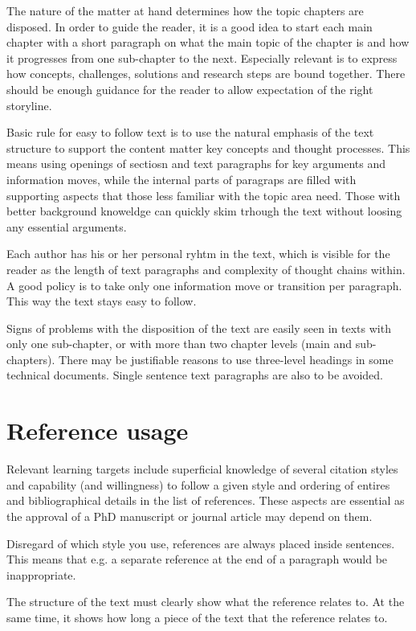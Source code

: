 The nature of the matter at hand determines how the topic chapters are disposed.
In order to guide the reader, it is a good idea to start each main chapter with a short paragraph 
on what the main topic of the chapter is and how it progresses from one sub-chapter to the
next. Especially relevant is to express how concepts, challenges,
solutions and research steps are bound together. There should be enough
guidance for the reader to allow expectation of the right storyline.


Basic rule for easy to follow text is to use the natural emphasis of the
text structure to support the content matter key concepts and thought
processes. This means using openings of sectiosn and text paragraphs for
key arguments and information moves, while the internal parts of
paragraps are filled with supporting aspects that those less familiar
with the topic area need. Those with better background knoweldge can
quickly skim trhough the text without loosing any essential arguments.

Each author has his or her personal ryhtm in the text, which is visible
for the reader as the length of text paragraphs and complexity of
thought chains within. A good policy is to take only one information
move or transition per paragraph. This way the text stays easy to follow.

Signs of problems with the disposition of the text are easily seen in texts
with only one sub-chapter, or with more than two chapter levels (main and sub-chapters). There may be justifiable reasons to use three-level 
headings in some technical documents. Single sentence text paragraphs
are also to be avoided.



\section{Reference usage}


Relevant learning targets include superficial knowledge of several
citation styles and capability (and willingness) to follow a given
style and ordering of entires and bibliographical details in the list of references.
These aspects are essential as the approval of a PhD manuscript or
journal article may depend on them.

Disregard of which style you use, 
references are always placed inside sentences.  This means that e.g. a separate reference at the end of a paragraph would be inappropriate.

The structure of the text must clearly show what the reference relates to.  At the same time, it 
shows how long a piece of the text that the reference relates to.

